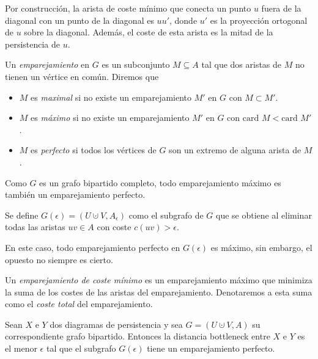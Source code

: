 \begin{remark}
Por construcción, la arista de coste mínimo que conecta un punto $u$ fuera de la diagonal con un punto de la diagonal es $uu'$, donde $u'$ es la proyección ortogonal de $u$ sobre la diagonal. Además, el coste de esta arista es la mitad de la persistencia de $u$. 
\end{remark}

\begin{definition}
Un \emph{emparejamiento} en $G$ es un subconjunto $M \subseteq A$ tal que dos aristas de $M$ no tienen un vértice en común. Diremos que
\begin{itemize}
	\item $M$ es \emph{maximal} si no existe un emparejamiento $M'$ en $G$ con $M \subset M'$.
	\item $M$ es \emph{máximo} si no existe un emparejamiento $M'$ en $G$ con $\text{card } M < \text{card } M'$.
	\item $M$ es \emph{perfecto} si todos los vértices de $G$ son un extremo de alguna arista de $M$.
\end{itemize}
\end{definition}

Como $G$ es un grafo bipartido completo, todo emparejamiento máximo es también un emparejamiento perfecto.

\begin{definition}
Se define $G(\epsilon)=(U \cupdot V, A_\epsilon)$ como el subgrafo de $G$ que se obtiene al eliminar todas las aristas $uv \in A$ con coste $c(uv)>\epsilon$.  
\end{definition}
En este caso, todo emparejamiento perfecto en $G(\epsilon)$ es máximo, sin embargo, el opuesto no siempre es cierto.

\begin{definition}
Un \emph{emparejamiento de coste mínimo} es un emparejamiento máximo que minimiza la suma de los costes de las aristas del emparejamiento. Denotaremos a esta suma como el \emph{coste total} del emparejamiento.
\end{definition}

\begin{lemma}
Sean $X$ e $Y$ dos diagramas de persistencia y sea $G =(U \cupdot V, A)$ su correspondiente grafo bipartido. Entonces la distancia bottleneck entre $X$ e $Y$ es el menor $\epsilon$ tal que el subgrafo $G(\epsilon)$ tiene un emparejamiento perfecto.
\end{lemma}

